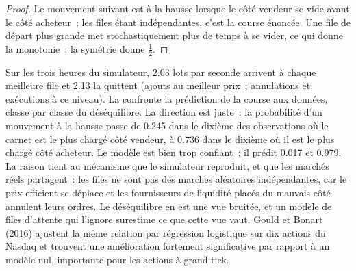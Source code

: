 \begin{proof}
Le mouvement suivant est à la hausse lorsque le côté vendeur se vide avant le côté acheteur~; les files étant indépendantes, c'est la course énoncée.
Une file de départ plus grande met stochastiquement plus de temps à se vider, ce qui donne la monotonie~; la symétrie donne $\tfrac12$.
\end{proof}

Sur les trois heures du simulateur, 2.03 lots par seconde arrivent à chaque meilleure file et 2.13 la quittent (ajouts au meilleur prix~;
annulations et exécutions à ce niveau). La  confronte la prédiction de la course aux données, classe par
classe du déséquilibre. La direction est juste~: la probabilité d'un mouvement à la hausse passe de 0.245 dans le dixième
des observations où le carnet est le plus chargé côté vendeur, à 0.736 dans le dixième où il est le plus chargé côté acheteur. Le modèle est bien trop confiant~: il prédit 0.017 et 0.979. La raison tient au
mécanisme que le simulateur reproduit, et que les marchés réels partagent~: les files ne sont pas des marches aléatoires indépendantes, car le
prix efficient se déplace et les fournisseurs de liquidité placés du mauvais côté annulent leurs ordres. Le déséquilibre en est une vue bruitée, et un modèle de files d'attente
qui l'ignore surestime ce que cette vue vaut. Gould et Bonart (2016) ajustent la même relation par régression logistique sur
dix actions du Nasdaq et trouvent une amélioration fortement significative par rapport à un modèle nul, importante pour les actions à grand tick.

\begin{omfigure}

\label{fig:rs:order-book-features:updown}
\end{omfigure}

